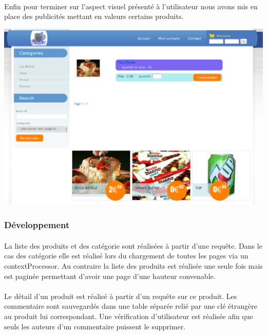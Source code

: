 \documentclass[twoside,UTF8]{EPURapport}
\begin{document}
                \paragraph{}Enfin pour terminer sur l'aspect visuel présenté à l'utilisateur nous avons mis en place des publicités mettant en valeurs certains produits.            

                \begin{center}
                    \includegraphics[width=0.8\linewidth]{logos/commande.png}
                \end{center}

            \subsubsection{Développement}

                \paragraph{}La liste des produits et des catégorie sont réalisées à partir d'une requête. Dans le cas des catégorie elle est réalisé lors du chargement de toutes les pages via un contextProcessor. Au contraire la liste des produits est réalisée une seule fois mais est paginée permettant d'avoir une page d'une hauteur convenable.

                \paragraph{}Le détail d'un produit est réalisé à partir d'un requête sur ce produit. Les commentaire sont sauvegardés dans une table séparée relié par une clé étrangère au produit lui correspondant. Une vérification d'utilisateur est réalisée afin que seuls les auteurs d'un commentaire puissent le supprimer.
\end{document}
